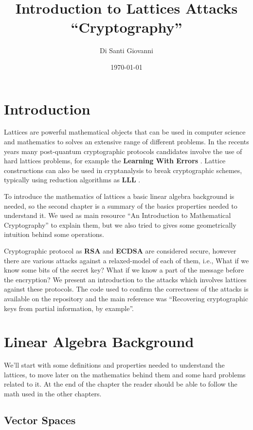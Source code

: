 \documentclass[a4paper,12pt]{report}
\title{Introduction to Lattices Attacks\\``Cryptography''}
\author{Di Santi Giovanni}
\date{\today}
\begin{document}
 
\maketitle

\tableofcontents

\chapter{Introduction}

Lattices are powerful mathematical objects that can be used in computer science and mathematics to solves an extensive range of different problems.
In the recents years many post-quantum cryptographic protocols candidates involve the use of hard lattices problems,
for example the \textbf{Learning With Errors} \cite{LWE}.
Lattice constructions can also be used in cryptanalysis to break cryptographic schemes, typically using reduction
algorithms as \textbf{LLL} \cite{LLL}.

To introduce the mathematics of lattices a basic linear algebra background is needed, so the second chapter is a summary of the
basics properties needed to understand it. We used as main resource ``An Introduction to Mathematical Cryptography''\cite{mathcrypto14} to
explain them, but we also tried to gives some geometrically intuition behind some operations.

Cryptographic protocol as \textbf{RSA} and \textbf{ECDSA} are considered secure, however there are various attacks against a
relaxed-model of each of them, i.e., What if we know some bits of the secret key? What if we know a part of the message before the encryption?
We present an introduction to the attacks which involves lattices against these protocols. The code used to confirm the correctness
of the attacks is available on the repository \cite{repo} and the main reference was
``Recovering cryptographic keys from partial information, by example''\cite{cryptoeprint:2020:1506}.

\chapter{Linear Algebra Background}

We'll start with some definitions and properties needed to understand the lattices, to move later on the mathematics behind them and some
hard problems related to it. At the end of the chapter the reader should be able to follow the math used in the other chapters.

\section{Vector Spaces}
\end{document}
